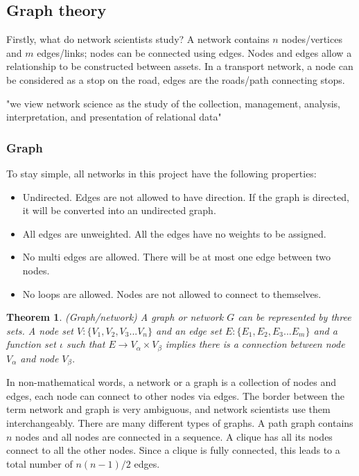 \documentclass[12pt]{article}
\newtheorem{theorem}{Theorem}[section]
\begin{document}
\subsection{Graph theory}
Firstly, what do network scientists study? A network contains $n$ nodes/vertices and $m$ edges/links; nodes can be connected using edges. Nodes and edges allow a relationship to be constructed between assets. In a transport network, a node can be considered as a stop on the road, edges are the roads/path connecting stops.
\begin{center}
    "we view network science as the study of the collection,
    management, analysis, interpretation, and presentation of relational data" \cite{brandes_robins_mccranie_wasserman_2013}
\end{center}

\subsubsection{Graph}
\label{graph}
To stay simple, all networks in this project have the following properties:
\begin{itemize}
    \item Undirected. Edges are not allowed to have direction. If the graph is directed, it will be converted into an undirected graph.
    \item All edges are unweighted. All the edges have no weights to be assigned.
    \item No multi edges are allowed. There will be at most one edge between two nodes.
    \item No loops are allowed. Nodes are not allowed to connect to themselves. 
\end{itemize}
\begin{theorem}{(Graph/network)}
    A graph or network $G$ can be represented by three sets. A node set $V:\{V_1,V_2,V_3...V_n\}$ and an edge set $E:\{E_1,E_2,E_3...E_m\}$ and a function set $\iota$ such that $E\rightarrow V_\alpha\times V_\beta$ implies there is a connection between node $V_\alpha$ and node $V_\beta$.
\end{theorem}
\par
In non-mathematical words, a network or a graph is a collection of nodes and edges, each node can connect to other nodes via edges. The border between the term network and graph is very ambiguous, and network scientists use them interchangeably. There are many different types of graphs. A path graph contains $n$ nodes and all nodes are connected in a sequence. A clique has all its nodes connect to all the other nodes. Since a clique is fully connected, this leads to a total number of $n(n-1)/2$ edges.
\end{document}
